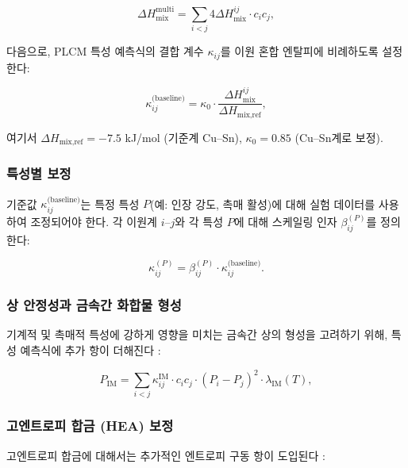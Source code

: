 \documentclass[12pt,a4paper]{article}
\begin{document}
	\begin{equation}
		\Delta H_{\text{mix}}^{\text{multi}} = \sum_{i<j} 4 \Delta H_{\text{mix}}^{ij} \cdot c_i c_j,
		\label{eq:multicomponent}
	\end{equation}
	
	다음으로, PLCM 특성 예측식의 결합 계수 \(\kappa_{ij}\)를 이원 혼합 엔탈피에 비례하도록 설정한다:
	
	\begin{equation}
		\kappa_{ij}^{\text{(baseline)}} = \kappa_0 \cdot \frac{\Delta H_{\text{mix}}^{ij}}{\Delta H_{\text{mix,ref}}},
		\label{eq:kappa-miedema}
	\end{equation}
	
	여기서 \(\Delta H_{\text{mix,ref}} = -7.5\) kJ/mol (기준계 Cu–Sn), \(\kappa_0 = 0.85\) (Cu–Sn계로 보정).
	
	\subsubsection{특성별 보정}
	
	기준값 \(\kappa_{ij}^{\text{(baseline)}}\)는 특정 특성 \(P\)(예: 인장 강도, 촉매 활성)에 대해 실험 데이터를 사용하여 조정되어야 한다. 각 이원계 \(i\)–\(j\)와 각 특성 \(P\)에 대해 스케일링 인자 \(\beta_{ij}^{(P)}\)를 정의한다:
	
	\begin{equation}
		\kappa_{ij}^{(P)} = \beta_{ij}^{(P)} \cdot \kappa_{ij}^{\text{(baseline)}}.
		\label{eq:beta-calibration}
	\end{equation}
	
	\subsubsection{상 안정성과 금속간 화합물 형성}
	
	기계적 및 촉매적 특성에 강하게 영향을 미치는 금속간 상의 형성을 고려하기 위해, 특성 예측식에 추가 항이 더해진다 \cite{Wen2019}:
	
	\begin{equation}
		P_{\text{IM}} = \sum_{i<j} \kappa_{ij}^{\text{IM}} \cdot c_i c_j \cdot (P_i - P_j)^2 \cdot \lambda_{\text{IM}}(T),
		\label{eq:intermetallic}
	\end{equation}
	
	\subsubsection{고엔트로피 합금 (HEA) 보정}
	
	고엔트로피 합금에 대해서는 추가적인 엔트로피 구동 항이 도입된다 \cite{Wen2019, Yang2012}:
	
\end{document}
